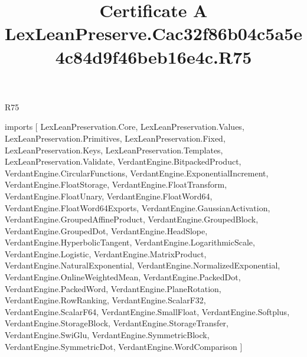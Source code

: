 \begin{lexlean}{R75}
\title{Certificate A LexLeanPreserve.Cac32f86b04c5a5e4c84d9f46beb16e4c.R75}
\begin{coremodule}
imports [
  LexLeanPreservation.Core,
  LexLeanPreservation.Values,
  LexLeanPreservation.Primitives,
  LexLeanPreservation.Fixed,
  LexLeanPreservation.Keys,
  LexLeanPreservation.Templates,
  LexLeanPreservation.Validate,
  VerdantEngine.BitpackedProduct,
  VerdantEngine.CircularFunctions,
  VerdantEngine.ExponentialIncrement,
  VerdantEngine.FloatStorage,
  VerdantEngine.FloatTransform,
  VerdantEngine.FloatUnary,
  VerdantEngine.FloatWord64,
  VerdantEngine.FloatWord64Exports,
  VerdantEngine.GaussianActivation,
  VerdantEngine.GroupedAffineProduct,
  VerdantEngine.GroupedBlock,
  VerdantEngine.GroupedDot,
  VerdantEngine.HeadSlope,
  VerdantEngine.HyperbolicTangent,
  VerdantEngine.LogarithmicScale,
  VerdantEngine.Logistic,
  VerdantEngine.MatrixProduct,
  VerdantEngine.NaturalExponential,
  VerdantEngine.NormalizedExponential,
  VerdantEngine.OnlineWeightedMean,
  VerdantEngine.PackedDot,
  VerdantEngine.PackedWord,
  VerdantEngine.PlaneRotation,
  VerdantEngine.RowRanking,
  VerdantEngine.ScalarF32,
  VerdantEngine.ScalarF64,
  VerdantEngine.SmallFloat,
  VerdantEngine.Softplus,
  VerdantEngine.StorageBlock,
  VerdantEngine.StorageTransfer,
  VerdantEngine.SwiGlu,
  VerdantEngine.SymmetricBlock,
  VerdantEngine.SymmetricDot,
  VerdantEngine.WordComparison
]


\end{coremodule}
\end{lexlean}

